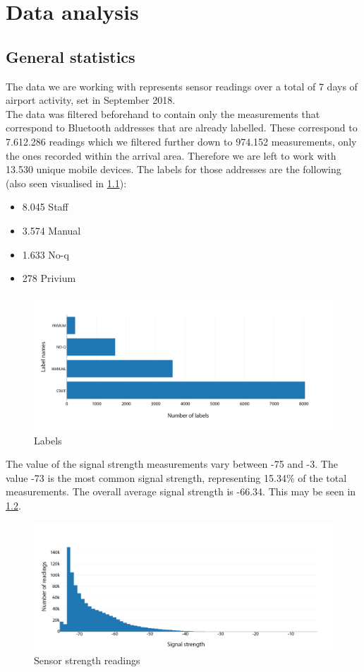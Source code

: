 \chapter{Data analysis}
\section{General statistics}
\label{sec:general_statistics}
The data we are working with represents sensor readings over a total of 7 days of airport activity, set in September 2018. \\
The data was filtered beforehand to contain only the measurements that correspond to Bluetooth addresses that are already labelled. These correspond to 7.612.286 readings which we filtered further down to 974.152 measurements, only the ones recorded within the arrival area. Therefore we are left to work with 13.530 unique mobile devices. The labels for those addresses are the following (also seen visualised in \cref{fig:stats_labels}):

\begin{itemize}
	\item 8.045 Staff
	\item 3.574 Manual
	\item 1.633 No-q
	\item 278 Privium
\end{itemize}

\begin{figure}[H]
    \centering
    \includegraphics[width=.75\textwidth]{Pictures/Labels.png}
    \caption{Labels}
    \label{fig:stats_labels}
\end{figure}

The value of the signal strength measurements vary between -75 and -3. The value -73 is the most common signal strength, representing 15.34\% of the total measurements. The overall average signal strength is -66.34. This may be seen in \cref{fig:sensor_strength_readings}.\\

\begin{figure}[H]
    \centering
    \includegraphics[width=.8\textwidth]{Pictures/Sensor_Strength_Readings.png}
    \caption{Sensor strength readings}
    \label{fig:sensor_strength_readings}
\end{figure}

